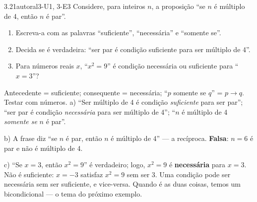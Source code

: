 \begin{exemplo}{3.2}{1}{autoral}{3-U1, 3-E3}\label{ex:3.2}
Considere, para inteiros $n$, a proposição \enquote{se $n$ é múltiplo de 4, então $n$ é par}.
\begin{enumerate}[label=\alph*)]
  \item Escreva-a com as palavras \enquote{suficiente}, \enquote{necessária} e \enquote{somente se}.
  \item Decida se é verdadeira: \enquote{ser par é condição suficiente para ser múltiplo de 4}.
  \item Para números reais $x$, \enquote{$x^2=9$} é condição necessária ou suficiente para \enquote{$x=3$}?
\end{enumerate}
\plano Antecedente = suficiente; consequente = necessária; \enquote{$p$ somente se $q$} = $p\rightarrow q$. Testar com números.
\resolucao
a) \enquote{Ser múltiplo de 4 é condição \emph{suficiente} para ser par}; \enquote{ser par é condição \emph{necessária} para ser múltiplo de 4}; \enquote{$n$ é múltiplo de 4 \emph{somente se} $n$ é par}.
\par b) A frase diz \enquote{se $n$ é par, então $n$ é múltiplo de 4} — a recíproca. \textbf{Falsa}: $n=6$ é par e não é múltiplo de 4.
\par c) \enquote{Se $x=3$, então $x^2=9$} é verdadeiro; logo, $x^2=9$ é \textbf{necessária} para $x=3$. Não é suficiente: $x=-3$ satisfaz $x^2=9$ sem ser 3.
\comentario Uma condição pode ser necessária sem ser suficiente, e vice-versa. Quando é as duas coisas, temos um bicondicional — o tema do próximo exemplo.
\end{exemplo}

